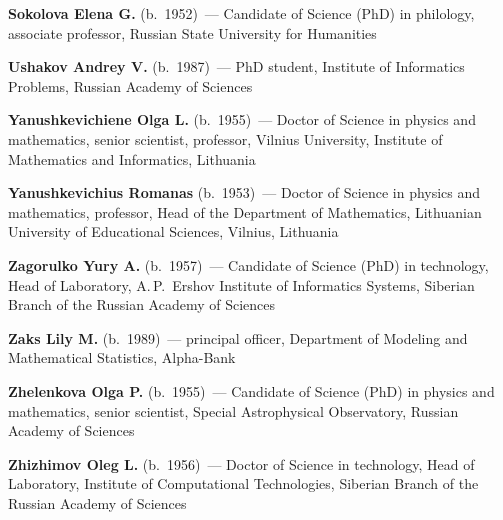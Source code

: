 \begin{multicols}{2}
\pagebreak

\noindent
\textbf{Sokolova Elena G.}  (b.\ 1952)~--- Candidate of Science (PhD) in philology, 
associate professor, Russian State University for Humanities



\vspace*{5pt}

\noindent
\textbf{Ushakov Andrey V.} (b.\ 1987)~--- PhD student, Institute of Informatics Problems, Russian
Academy of Sciences

\vspace*{5pt}

\noindent
\textbf{Yanushkevichiene Olga L.} (b.\ 1955)~--- Doctor of Science in physics and mathematics, 
senior scientist, professor, Vilnius University, Institute of Mathematics and Informatics, 
Lithuania


\vspace*{5pt}

\noindent
\textbf{Yanushkevichius Romanas} (b.\ 1953)~--- Doctor of Science in physics and mathematics, 
professor, Head of the Department of Mathematics, 
Lithuanian University of Educational Sciences, Vilnius, Lithuania


\columnbreak

\noindent
\textbf{Zagorulko Yury A.}  (b.\ 1957)~--- Candidate of Science (PhD) in technology, 
Head of Laboratory, A.\,P.~Ershov Institute of Informatics Systems, Siberian 
Branch of the Russian Academy of Sciences

\vspace*{5pt}

\noindent
\textbf{Zaks Lily M.} (b.\ 1989)~--- principal officer, Department of Modeling and 
Mathematical Statistics, Alpha-Bank


\vspace*{5pt}

\noindent
\textbf{Zhelenkova Olga P.} (b.\ 1955)~--- Candidate of Science (PhD) in physics and 
mathematics, senior scientist, Special Astrophysical Observatory, Russian Academy of Sciences

\vspace*{5pt}

\noindent
\textbf{Zhizhimov Oleg L.} (b.\ 1956)~--- Doctor of Science in technology, 
Head of Laboratory, Institute of Computational Technologies,
Siberian Branch of the Russian Academy of Sciences

\def\leftfootline{\small{\textbf{\thepage}
\hfill ИНФОРМАТИКА И ЕЁ ПРИМЕНЕНИЯ\ \ \ том~6\ \ \ выпуск~3\ \ \ 2012}
}%
 \def\rightfootline{\small{ИНФОРМАТИКА И ЕЁ ПРИМЕНЕНИЯ\ \ \ том~6\ \ \ выпуск~3\ \ \ 2012
\hfill \textbf{\thepage}}}



\end{multicols}
\newpage